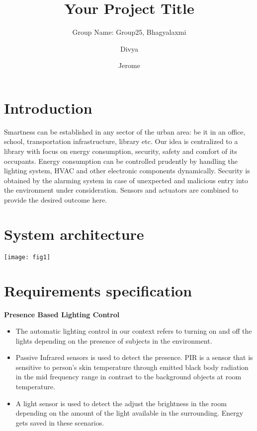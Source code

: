 \documentclass[runningheads]{llncs}
\begin{document}
\title{Your Project Title}

\author{Group Name: Group25, Bhagyalaxmi \and
Divya \and
Jerome}

\maketitle
%
\section{Introduction}
Smartness can be established in any sector of the urban area: be it in an office, school, transportation infrastructure, library etc. Our idea is centralized to a library with focus on energy consumption, security, safety and comfort of its occupants. 
Energy consumption can be controlled prudently by handling the lighting system, HVAC and other electronic components dynamically. Security is obtained by the alarming system in case of unexpected and malicious entry into the environment under consideration. 
Sensors and actuators are combined to provide the desired outcome here.

\section{System architecture}

\texttt{[image: fig1]}

\section{Requirements specification}

\textbf{Presence Based Lighting Control}
\begin{itemize}
\item The automatic lighting control in our context refers to turning on and off the lights depending on the presence of subjects in the environment. 
\item Passive Infrared sensors is used to detect the presence. PIR is a sensor that is sensitive to person’s skin temperature through emitted black body radiation in the mid frequency range in contrast to the background objects at room temperature. 
\item A light sensor is used to detect the adjust the brightness in the room depending on the amount of the light available in the surrounding. Energy gets saved in these scenarios.
\end{itemize}
\end{document}
